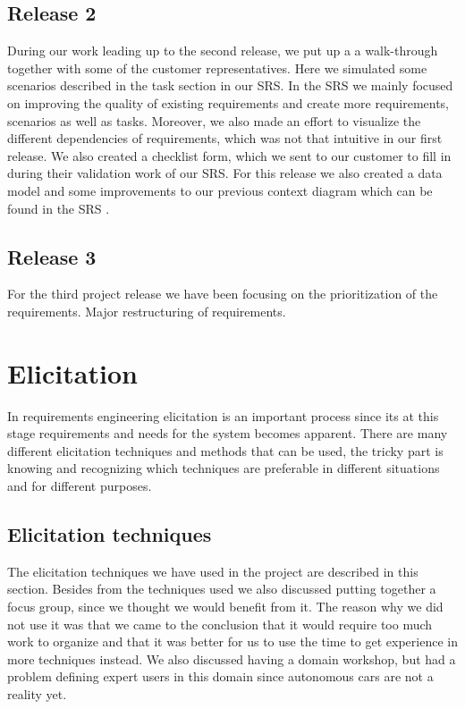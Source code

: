 \documentclass[10pt]{article}
\begin{document}
\subsection{Release 2}
During our work leading up to the second release, we put up a a walk-through together with some of the customer representatives. Here we simulated some scenarios described in the task section in our SRS. In the SRS we mainly focused on improving the quality of existing requirements and create more requirements, scenarios as well as tasks. Moreover, we also made an effort to visualize the different dependencies of requirements, which was not that intuitive in our first release. We also created a checklist form, which we sent to our customer to fill in during their validation work of our SRS. 
For this release we also created a data model and some improvements to our previous context diagram which can be found in the SRS \cite{srs}.

\subsection{Release 3}
For the third project release we have been focusing on the prioritization of the requirements.
Major restructuring of requirements.

\section{Elicitation}
\sloppy
\noindent
In requirements engineering elicitation is an important process since its at this stage requirements and needs for the system becomes apparent. There are many different elicitation techniques and methods that can be used, the tricky part is knowing and recognizing which techniques are preferable in different situations and for different purposes.

\subsection{Elicitation techniques}
The elicitation techniques we have used in the project are described in this section. Besides from the techniques used we also discussed putting together a focus group, since we thought we would benefit from it. The reason why we did not use it was that we came to the conclusion that it would require too much work to organize and that it was better for us to use the time to get experience in more techniques instead. We also discussed having a domain workshop, but had a problem defining expert users in this domain since autonomous cars are not a reality yet.
\end{document}
